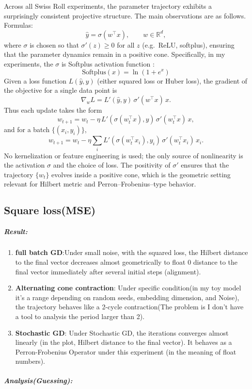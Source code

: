 \documentclass[11pt]{article}
\begin{document}
Across all Swiss Roll experiments, the parameter trajectory exhibits a
surprisingly consistent projective structure.  The main observations are
as follows.
Formulas:
\[
\hat{y} = \sigma(w^\top x), 
\qquad w \in \mathbb{R}^d,
\]
where $\sigma$ is chosen so that $\sigma'(z)\ge 0$ for all $z$
(e.g.\ ReLU, softplus), ensuring that the parameter dynamics remain in a
positive cone.
Specifically, in my experiments, the $\sigma$ is Softplus activation function : \[
\text{Softplus}(x) = \ln\left(1 + e^x\right)
\]
Given a loss function $L(\hat{y}, y)$ (either squared loss or Huber
loss), the gradient of the objective for a single data point is
\[
\nabla_w L = L'(\hat{y},y)\,\sigma'(w^\top x)\,x.
\]
Thus each update takes the form
\[
w_{t+1}
= w_t - \eta\, L'(\sigma(w_t^\top x), y)\,\sigma'(w_t^\top x)\,x,
\]
and for a batch $\{(x_i,y_i)\}$,
\[
w_{t+1}= w_t - \eta \sum_i 
L'(\sigma(w_t^\top x_i), y_i)\,\sigma'(w_t^\top x_i)\,x_i.
\]
No kernelization or feature engineering is used; the only source of
nonlinearity is the activation $\sigma$ and the choice of loss.  The
positivity of $\sigma'$ ensures that the trajectory $\{w_t\}$ evolves
inside a positive cone, which is the geometric setting relevant for
Hilbert metric and Perron--Frobenius--type behavior.

\subsection{Square loss(MSE)}
\subparagraph{\textbf{Result}:}
\begin{enumerate}
    \item \textbf{full batch GD}:Under small noise, with the squared loss, the Hilbert distance to the final vector decreases almost geometrically to float 0 distance to the final vector immediately after several initial steps (alignment).
    \item \textbf{Alternating cone contraction}: Under specific condition(in my toy model it's a range depending on random seeds, embedding dimension, and Noise), the trajectory behaves like a 2-cycle contraction(The problem is I don't have a tool to analysis the period larger than 2).
    \item \textbf{Stochastic GD}: Under Stochastic GD, the iterations converges almost linearly (in the plot, Hilbert distance to the final vector). It behaves as a Perron-Frobenius Operator under this experiment (in the meaning of float numbers).
\end{enumerate}

\subparagraph{\textbf{Analysis(Guessing):}}
\end{document}
